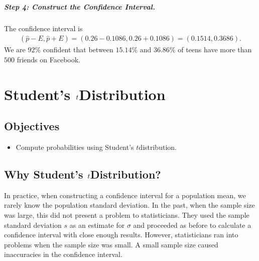 \documentclass[letterpaper,10pt,english]{jupyterBook}
\begin{document}
\subparagraph{Step 4: Construct the Confidence Interval.}
\label{\detokenize{Ch5 Confidence Intervals/5.2 Estimating Population Proportions:id3}}
\sphinxAtStartPar
The confidence interval is
\begin{equation*}
\begin{split} (\hat{p} - E, \hat{p} + E) = (0.26 - 0.1086, 0.26 + 0.1086) = (0.1514, 0.3686). \end{split}
\end{equation*}
\sphinxAtStartPar
We are \(92\%\) confident that between \(15.14\%\) and \(36.86\%\) of teens have more than \(500\) friends on Facebook.

\sphinxstepscope


\section{Student’s \protect\(t\protect\)\sphinxhyphen{}Distribution}
\label{\detokenize{Ch5 Confidence Intervals/5.3 Student's t-Distribution:student-s-t-distribution}}\label{\detokenize{Ch5 Confidence Intervals/5.3 Student's t-Distribution::doc}}

\subsection{Objectives}
\label{\detokenize{Ch5 Confidence Intervals/5.3 Student's t-Distribution:objectives}}\begin{itemize}
\item {} 
\sphinxAtStartPar
Compute probabilities using Student’s \(t\)\sphinxhyphen{}distribution.

\end{itemize}


\subsection{Why Student’s \protect\(t\protect\)\sphinxhyphen{}Distribution?}
\label{\detokenize{Ch5 Confidence Intervals/5.3 Student's t-Distribution:why-student-s-t-distribution}}
\sphinxAtStartPar
In practice, when constructing a confidence interval for a population mean, we rarely know the population standard deviation. In the past, when the sample size was large, this did not present a problem to statisticians. They used the sample standard deviation \(s\) as an estimate for \(\sigma\) and proceeded as before to calculate a confidence interval with close enough results. However, statisticians ran into problems when the sample size was small. A small sample size caused inaccuracies in the confidence interval.
\end{document}
